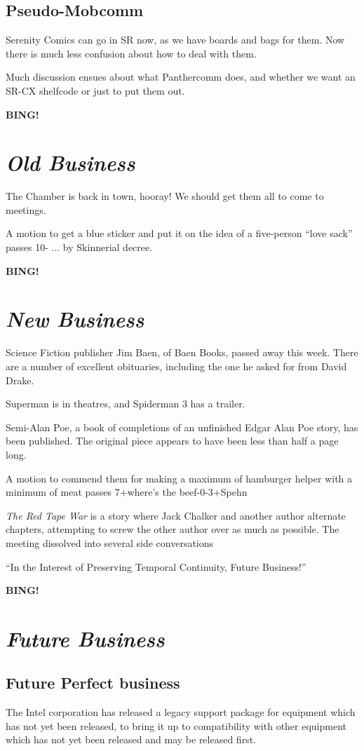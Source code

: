 \documentclass[10pt]{article}
\newcommand{\bing}{{\bf BING!} }
\newcommand{\goto}[1]{\bing \vskip 12pt \section*{{\em{#1}}}}
\begin{document}
\subsection*{Pseudo-Mobcomm}
Serenity Comics can go in SR now, as we have boards and bags for them.
Now there is much less confusion about how to deal with them.

Much discussion ensues about what Panthercomm does, and whether we
want an SR-CX shelfcode or just to put them out.


\goto{Old Business}
The Chamber is back in town, hooray! We should get them all to come to meetings.

A motion to get a blue sticker and put it on the idea of a five-person
``love sack''  passes 10-  ... by Skinnerial decree.

\goto{New Business}
Science Fiction publisher Jim Baen, of Baen Books, passed away this
week.  There are a number of excellent obituaries, including the one
he asked for from David Drake.

Superman is in theatres, and Spiderman 3 has a trailer.

Semi-Alan Poe, a book of completions of an unfinished Edgar Alan Poe
story, has been published. The original piece appears to have been
less than half a page long.

A motion to commend them for making a maximum of hamburger helper with
a minimum of meat passes 7+where's the beef-0-3+Spehn

\emph{The Red Tape War} is a story where Jack Chalker and another
author alternate chapters, attempting to screw the other author over
as much as possible.
The meeting dissolved into several side conversations 

``In the Interest of Preserving Temporal Continuity, Future
Business!''

\goto{Future Business}

\subsection{Future Perfect business} 
The Intel corporation has released a legacy support package for
equipment which has not yet been released, to bring it up to
compatibility with other equipment which has not yet been released and
may be released first.
\end{document}

